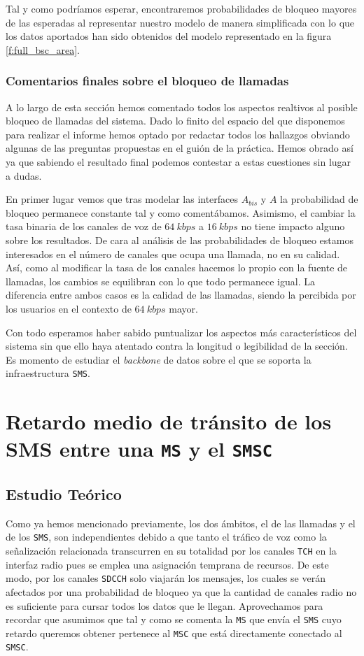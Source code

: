 \documentclass[10pt]{article}
\begin{document}
				Tal y como podríamos esperar, encontraremos probabilidades de bloqueo mayores de las esperadas al representar nuestro modelo de manera simplificada con lo que los datos aportados han sido obtenidos del modelo representado en la figura \ref{f:full_bsc_area}.

			\subsubsection{Comentarios finales sobre el bloqueo de llamadas}
				A lo largo de esta sección hemos comentado todos los aspectos realtivos al posible bloqueo de llamadas del sistema. Dado lo finito del espacio del que disponemos para realizar el informe hemos optado por redactar todos los hallazgos obviando algunas de las preguntas propuestas en el guión de la práctica. Hemos obrado así ya que sabiendo el resultado final podemos contestar a estas cuestiones sin lugar a dudas.

				En primer lugar vemos que tras modelar las interfaces $A_{bis}$ y $A$ la probabilidad de bloqueo permanece constante tal y como comentábamos. Asimismo, el cambiar la tasa binaria de los canales de voz de $64\ kbps$ a $16\ kbps$ no tiene impacto alguno sobre los resultados. De cara al análisis de las probabilidades de bloqueo estamos interesados en el número de canales que ocupa una llamada, no en su calidad. Así, como al modificar la tasa de los canales hacemos lo propio con la fuente de llamadas, los cambios se equilibran con lo que todo permanece igual. La diferencia entre ambos casos es la calidad de las llamadas, siendo la percibida por los usuarios en el contexto de $64\ kbps$ mayor.

				Con todo esperamos haber sabido puntualizar los aspectos más característicos del sistema sin que ello haya atentado contra la longitud o legibilidad de la sección. Es momento de estudiar el \textit{backbone} de datos sobre el que se soporta la infraestructura \texttt{SMS}.

	\section{Retardo medio de tránsito de los SMS entre una \texttt{MS} y el \texttt{SMSC}}
		\subsection{Estudio Teórico}
			Como ya hemos mencionado previamente, los dos ámbitos, el de las llamadas y el de los \texttt{SMS}, son independientes debido a que tanto el tráfico de voz como la señalización relacionada transcurren en su totalidad por los canales \texttt{TCH} en la interfaz radio pues se emplea una asignación temprana de recursos. De este modo, por los canales \texttt{SDCCH} solo viajarán los mensajes, los cuales se verán afectados por una probabilidad de bloqueo ya que la cantidad de canales radio no es suficiente para cursar todos los datos que le llegan. Aprovechamos para recordar que asumimos que tal y como se comenta la \texttt{MS} que envía el \texttt{SMS} cuyo retardo queremos obtener pertenece al \texttt{MSC} que está directamente conectado al \texttt{SMSC}.
\end{document}
